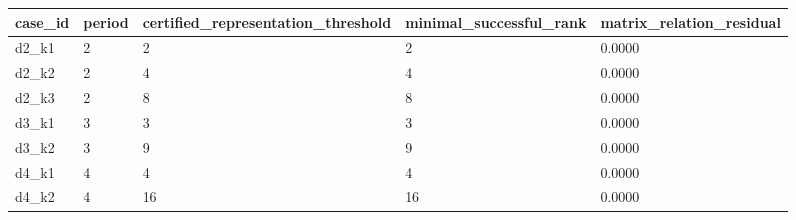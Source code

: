 \begin{tabular}{lllll}
\toprule
case_id & period & certified_representation_threshold & minimal_successful_rank & matrix_relation_residual\\
\midrule
d2\_k1 & 2 & 2 & 2 & 0.0000\\
d2\_k2 & 2 & 4 & 4 & 0.0000\\
d2\_k3 & 2 & 8 & 8 & 0.0000\\
d3\_k1 & 3 & 3 & 3 & 0.0000\\
d3\_k2 & 3 & 9 & 9 & 0.0000\\
d4\_k1 & 4 & 4 & 4 & 0.0000\\
d4\_k2 & 4 & 16 & 16 & 0.0000\\
\bottomrule
\end{tabular}
